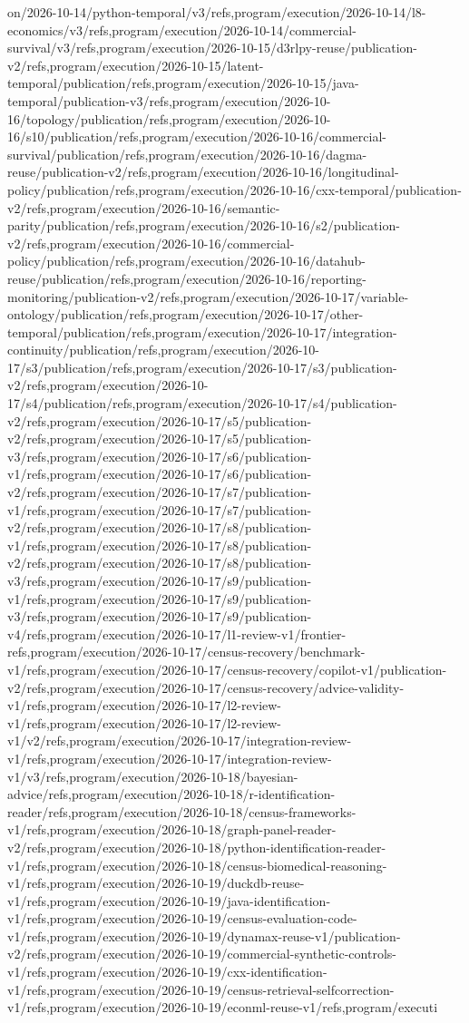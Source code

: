 \documentclass[11pt,a4paper,openany]{book}
\begin{document}
on/2026-10-14/python-temporal/v3/refs,program/execution/2026-10-14/l8-economics/v3/refs,program/execution/2026-10-14/commercial-survival/v3/refs,program/execution/2026-10-15/d3rlpy-reuse/publication-v2/refs,program/execution/2026-10-15/latent-temporal/publication/refs,program/execution/2026-10-15/java-temporal/publication-v3/refs,program/execution/2026-10-16/topology/publication/refs,program/execution/2026-10-16/s10/publication/refs,program/execution/2026-10-16/commercial-survival/publication/refs,program/execution/2026-10-16/dagma-reuse/publication-v2/refs,program/execution/2026-10-16/longitudinal-policy/publication/refs,program/execution/2026-10-16/cxx-temporal/publication-v2/refs,program/execution/2026-10-16/semantic-parity/publication/refs,program/execution/2026-10-16/s2/publication-v2/refs,program/execution/2026-10-16/commercial-policy/publication/refs,program/execution/2026-10-16/datahub-reuse/publication/refs,program/execution/2026-10-16/reporting-monitoring/publication-v2/refs,program/execution/2026-10-17/variable-ontology/publication/refs,program/execution/2026-10-17/other-temporal/publication/refs,program/execution/2026-10-17/integration-continuity/publication/refs,program/execution/2026-10-17/s3/publication/refs,program/execution/2026-10-17/s3/publication-v2/refs,program/execution/2026-10-17/s4/publication/refs,program/execution/2026-10-17/s4/publication-v2/refs,program/execution/2026-10-17/s5/publication-v2/refs,program/execution/2026-10-17/s5/publication-v3/refs,program/execution/2026-10-17/s6/publication-v1/refs,program/execution/2026-10-17/s6/publication-v2/refs,program/execution/2026-10-17/s7/publication-v1/refs,program/execution/2026-10-17/s7/publication-v2/refs,program/execution/2026-10-17/s8/publication-v1/refs,program/execution/2026-10-17/s8/publication-v2/refs,program/execution/2026-10-17/s8/publication-v3/refs,program/execution/2026-10-17/s9/publication-v1/refs,program/execution/2026-10-17/s9/publication-v3/refs,program/execution/2026-10-17/s9/publication-v4/refs,program/execution/2026-10-17/l1-review-v1/frontier-refs,program/execution/2026-10-17/census-recovery/benchmark-v1/refs,program/execution/2026-10-17/census-recovery/copilot-v1/publication-v2/refs,program/execution/2026-10-17/census-recovery/advice-validity-v1/refs,program/execution/2026-10-17/l2-review-v1/refs,program/execution/2026-10-17/l2-review-v1/v2/refs,program/execution/2026-10-17/integration-review-v1/refs,program/execution/2026-10-17/integration-review-v1/v3/refs,program/execution/2026-10-18/bayesian-advice/refs,program/execution/2026-10-18/r-identification-reader/refs,program/execution/2026-10-18/census-frameworks-v1/refs,program/execution/2026-10-18/graph-panel-reader-v2/refs,program/execution/2026-10-18/python-identification-reader-v1/refs,program/execution/2026-10-18/census-biomedical-reasoning-v1/refs,program/execution/2026-10-19/duckdb-reuse-v1/refs,program/execution/2026-10-19/java-identification-v1/refs,program/execution/2026-10-19/census-evaluation-code-v1/refs,program/execution/2026-10-19/dynamax-reuse-v1/publication-v2/refs,program/execution/2026-10-19/commercial-synthetic-controls-v1/refs,program/execution/2026-10-19/cxx-identification-v1/refs,program/execution/2026-10-19/census-retrieval-selfcorrection-v1/refs,program/execution/2026-10-19/econml-reuse-v1/refs,program/executi
\end{document}
